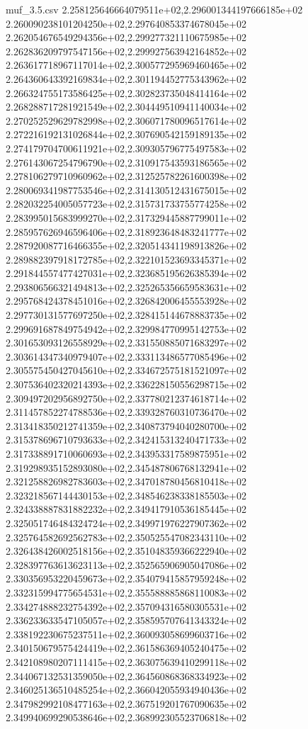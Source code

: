 \begin{filecontents*}{muf_3.5.csv}
2.258125646664079511e+02,2.296001344197666185e+02
2.260090238101204250e+02,2.297640853374678045e+02
2.262054676549294356e+02,2.299277321110675985e+02
2.262836209797547156e+02,2.299927563942164852e+02
2.263617718967117014e+02,2.300577295969460465e+02
2.264360643392169834e+02,2.301194452775343962e+02
2.266324755173586425e+02,2.302823735048414164e+02
2.268288717281921549e+02,2.304449510941140034e+02
2.270252529629782998e+02,2.306071780096517614e+02
2.272216192131026844e+02,2.307690542159189135e+02
2.274179704700611921e+02,2.309305796775497583e+02
2.276143067254796790e+02,2.310917543593186565e+02
2.278106279710960962e+02,2.312525782261600398e+02
2.280069341987753546e+02,2.314130512431675015e+02
2.282032254005057723e+02,2.315731733755774258e+02
2.283995015683999270e+02,2.317329445887799011e+02
2.285957626946596406e+02,2.318923648483241777e+02
2.287920087716466355e+02,2.320514341198913826e+02
2.289882397918172785e+02,2.322101523693345371e+02
2.291844557477427031e+02,2.323685195626385394e+02
2.293806566321494813e+02,2.325265356659583631e+02
2.295768424378451016e+02,2.326842006455553928e+02
2.297730131577697250e+02,2.328415144678883735e+02
2.299691687849754942e+02,2.329984770995142753e+02
2.301653093126558929e+02,2.331550885071683297e+02
2.303614347340979407e+02,2.333113486577085496e+02
2.305575450427045610e+02,2.334672575181521097e+02
2.307536402320214393e+02,2.336228150556298715e+02
2.309497202956892750e+02,2.337780212374618714e+02
2.311457852274788536e+02,2.339328760310736470e+02
2.313418350212741359e+02,2.340873794040280700e+02
2.315378696710793633e+02,2.342415313240471733e+02
2.317338891710060693e+02,2.343953317589875951e+02
2.319298935152893080e+02,2.345487806768132941e+02
2.321258826982783603e+02,2.347018780456810418e+02
2.323218567144430153e+02,2.348546238338185503e+02
2.324338887831882232e+02,2.349417910536185445e+02
2.325051746484324724e+02,2.349971976227907362e+02
2.325764582692562783e+02,2.350525547082343110e+02
2.326438426002518156e+02,2.351048359366222940e+02
2.328397763613623113e+02,2.352565906905047086e+02
2.330356953220459673e+02,2.354079415857959248e+02
2.332315994775654531e+02,2.355588885868110083e+02
2.334274888232754392e+02,2.357094316580305531e+02
2.336233633547105057e+02,2.358595707641343324e+02
2.338192230675237511e+02,2.360093058699603716e+02
2.340150679575424419e+02,2.361586369405240475e+02
2.342108980207111415e+02,2.363075639410299118e+02
2.344067132531359050e+02,2.364560868368334923e+02
2.346025136510485254e+02,2.366042055934940436e+02
2.347982992108477163e+02,2.367519201767090635e+02
2.349940699290538646e+02,2.368992305523706818e+02

\end{filecontents*}
